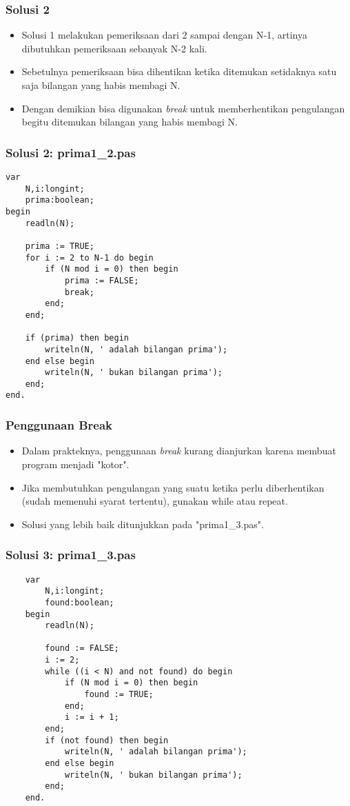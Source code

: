 \documentclass{beamer}
\begin{document}
\begin{frame}
\frametitle{Solusi 2}
\begin{itemize}
	\item Solusi 1 melakukan pemeriksaan dari 2 sampai dengan N-1, artinya dibutuhkan pemeriksaan sebanyak N-2 kali.
	\item Sebetulnya pemeriksaan bisa dihentikan ketika ditemukan setidaknya satu saja bilangan yang habis membagi N.
	\item Dengan demikian bisa digunakan \textit{break} untuk memberhentikan pengulangan begitu ditemukan bilangan yang habis membagi N.
\end{itemize}
\end{frame}

\begin{frame}[fragile]
\frametitle{Solusi 2: prima1\_2.pas}
\begin{lstlisting}
var
    N,i:longint;
    prima:boolean;
begin
    readln(N);

    prima := TRUE;
    for i := 2 to N-1 do begin
        if (N mod i = 0) then begin
            prima := FALSE;
            break;
        end;
    end;

    if (prima) then begin
        writeln(N, ' adalah bilangan prima');
    end else begin
        writeln(N, ' bukan bilangan prima');
    end;
end.
\end{lstlisting}
\end{frame}

\begin{frame}
\frametitle{Penggunaan Break}
\begin{itemize}
	\item Dalam prakteknya, penggunaan \textit{break} kurang dianjurkan karena membuat program menjadi "kotor".
	\item Jika membutuhkan pengulangan yang suatu ketika perlu diberhentikan (sudah memenuhi syarat tertentu), gunakan while atau repeat.
	\item Solusi yang lebih baik ditunjukkan pada "prima1\_3.pas".
\end{itemize}
\end{frame}

\begin{frame}[fragile]
\frametitle{Solusi 3: prima1\_3.pas}
\begin{lstlisting}
	var
	    N,i:longint;
	    found:boolean;
	begin
	    readln(N);
	
	    found := FALSE;
	    i := 2;
	    while ((i < N) and not found) do begin
	        if (N mod i = 0) then begin
	            found := TRUE;
	        end;
	        i := i + 1;
	    end;
	    if (not found) then begin
	        writeln(N, ' adalah bilangan prima');
	    end else begin
	        writeln(N, ' bukan bilangan prima');
	    end;
	end.
\end{lstlisting}
\end{frame}
\end{document}
